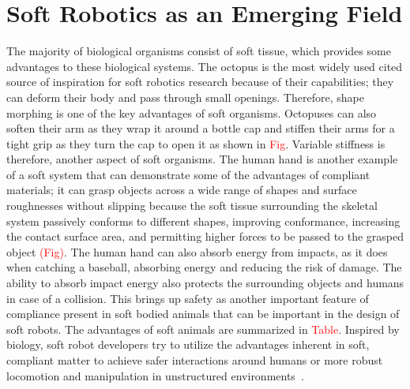 \section{Soft Robotics as an Emerging Field}
\label{sec:emerging}
The majority of biological organisms consist of soft tissue, which provides some advantages to these biological systems. The octopus is the most widely used cited source of inspiration for soft robotics research because of their capabilities; they can deform their body and pass through small openings. Therefore, shape morphing is one of the key advantages of soft organisms. Octopuses can also soften their arm as they wrap it around a bottle cap and stiffen their arms for a tight grip as they turn the cap to open it as shown in \textcolor{red}{Fig}. Variable stiffness is therefore, another aspect of soft organisms. The human hand is another example of a soft system that can demonstrate some of the advantages of compliant materials; it can grasp objects across a wide range of shapes and surface roughnesses without slipping because the soft tissue surrounding the skeletal system passively conforms to different shapes, improving conformance, increasing the contact surface area, and permitting higher forces to be passed to the grasped object \textcolor{red}{(Fig)}. The human hand can also absorb energy from impacts, as it does when catching a baseball, absorbing energy and reducing the risk of damage. The ability to absorb impact energy also protects the surrounding objects and humans in case of a collision. This brings up safety as another important feature of compliance present in soft bodied animals  that can be important in the design of soft robots. The advantages of soft animals are summarized in \textcolor{red}{Table}. Inspired by biology, soft robot developers try to utilize the advantages inherent in soft, compliant matter to achieve safer interactions around humans or more robust locomotion and manipulation in unstructured environments~\cite{martinez2013,laschi2012,Tolley2014d,AdamBilodeau2015}.	

